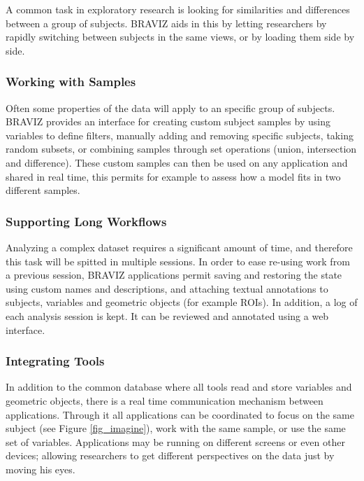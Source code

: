 \documentclass[twocolumn]{svjour3}
\begin{document}
A common task in exploratory research is looking for similarities and differences between a group of subjects. BRAVIZ aids in this by letting researchers by rapidly switching between subjects in the same views, or by loading them side by side.

\subsubsection{Working with Samples}

Often some properties of the data will apply to an specific group of subjects. BRAVIZ provides an interface for creating custom subject samples by using variables to define filters, manually adding and removing specific subjects, taking random subsets, or combining samples through set operations (union, intersection and difference).  These custom samples can then be used on any application and shared in real time, this permits for example to assess how a model fits in two different samples.

\subsubsection{Supporting Long Workflows}

Analyzing a complex dataset requires a significant amount of time, and therefore this task will be spitted in multiple sessions. In order to ease re-using work from a previous session, BRAVIZ applications permit saving and restoring the state using custom names and descriptions, and attaching textual annotations to subjects, variables and geometric objects (for example ROIs). In addition, a log of each analysis session is kept. It can be reviewed and annotated using a web interface.

\subsubsection{Integrating Tools}

In addition to the common database where all tools read and store variables and geometric objects, there is a real time communication mechanism between applications. Through it all applications can be coordinated to focus on the same subject (see Figure \ref{fig_imagine}), work with the same sample, or use the same set of variables. Applications may be running on different screens or even other devices; allowing researchers to get different perspectives on the data just by moving his eyes.
\end{document}
